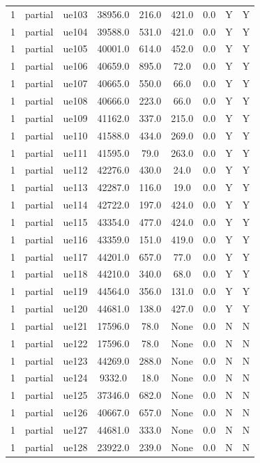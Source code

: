 \begin{table}[ht]
\begin{tabular}{|c|c|c|c|c|c|c|c|c|}
1 & partial & ue103 & 38956.0 & 216.0 & 421.0 & 0.0 & Y & Y \\
1 & partial & ue104 & 39588.0 & 531.0 & 421.0 & 0.0 & Y & Y \\
1 & partial & ue105 & 40001.0 & 614.0 & 452.0 & 0.0 & Y & Y \\
1 & partial & ue106 & 40659.0 & 895.0 & 72.0 & 0.0 & Y & Y \\
1 & partial & ue107 & 40665.0 & 550.0 & 66.0 & 0.0 & Y & Y \\
1 & partial & ue108 & 40666.0 & 223.0 & 66.0 & 0.0 & Y & Y \\
1 & partial & ue109 & 41162.0 & 337.0 & 215.0 & 0.0 & Y & Y \\
1 & partial & ue110 & 41588.0 & 434.0 & 269.0 & 0.0 & Y & Y \\
1 & partial & ue111 & 41595.0 & 79.0 & 263.0 & 0.0 & Y & Y \\
1 & partial & ue112 & 42276.0 & 430.0 & 24.0 & 0.0 & Y & Y \\
1 & partial & ue113 & 42287.0 & 116.0 & 19.0 & 0.0 & Y & Y \\
1 & partial & ue114 & 42722.0 & 197.0 & 424.0 & 0.0 & Y & Y \\
1 & partial & ue115 & 43354.0 & 477.0 & 424.0 & 0.0 & Y & Y \\
1 & partial & ue116 & 43359.0 & 151.0 & 419.0 & 0.0 & Y & Y \\
1 & partial & ue117 & 44201.0 & 657.0 & 77.0 & 0.0 & Y & Y \\
1 & partial & ue118 & 44210.0 & 340.0 & 68.0 & 0.0 & Y & Y \\
1 & partial & ue119 & 44564.0 & 356.0 & 131.0 & 0.0 & Y & Y \\
1 & partial & ue120 & 44681.0 & 138.0 & 427.0 & 0.0 & Y & Y \\
1 & partial & ue121 & 17596.0 & 78.0 & None & 0.0 & N & N \\
1 & partial & ue122 & 17596.0 & 78.0 & None & 0.0 & N & N \\
1 & partial & ue123 & 44269.0 & 288.0 & None & 0.0 & N & N \\
1 & partial & ue124 & 9332.0 & 18.0 & None & 0.0 & N & N \\
1 & partial & ue125 & 37346.0 & 682.0 & None & 0.0 & N & N \\
1 & partial & ue126 & 40667.0 & 657.0 & None & 0.0 & N & N \\
1 & partial & ue127 & 44681.0 & 333.0 & None & 0.0 & N & N \\
1 & partial & ue128 & 23922.0 & 239.0 & None & 0.0 & N & N \\

\end{tabular}
\end{table}
